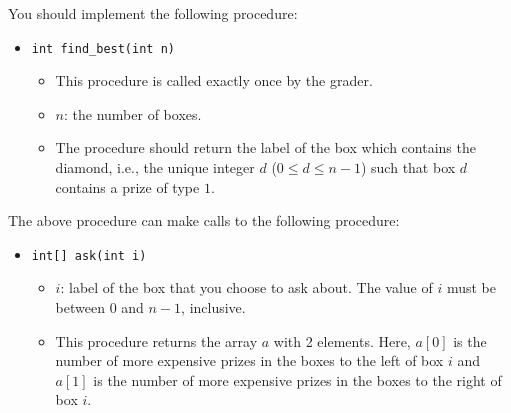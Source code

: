 You should implement the following procedure:

\begin{itemize}
\item \texttt{int find\_best(int n)}
\begin{itemize}
\item This procedure is called exactly once by the grader.
\item $n$: the number of boxes.
\item The procedure should return the label of the box which contains the diamond, i.e., the unique integer $d$ ($0 \leq d \leq n - 1$) such that box $d$ contains a prize of type $1$.
\end{itemize}
\end{itemize}


The above procedure can make calls to the following procedure:

\begin{itemize}
\item \texttt{int[] ask(int i)}
\begin{itemize}
\item $i$: label of the box that you choose to ask about. The value of $i$ must be between $0$ and $n - 1$, inclusive.
\item This procedure returns the array $a$ with 2 elements. Here, $a[0]$ is the number of more expensive prizes in the boxes to the left of box $i$ and $a[1]$ is the number of more expensive prizes in the boxes to the right of box $i$.
\end{itemize}
\end{itemize}



